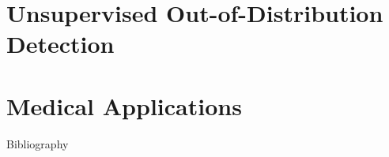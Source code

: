 \documentclass[aspectratio=169,xetex]{beamer}
\title{\color{dtured}\noindent\large\MakeUppercase{\thesistitle}}
\subtitle{\noindent\normalsize\MakeUppercase{\thesissubtitle}}
\author{Jakob D. Havtorn}
\date{\today}
\begin{document}
\frame{\maketitle}





\part{Unsupervised Out-of-Distribution Detection}



\part{Medical Applications}




\begin{frame}[allowframebreaks]{Bibliography}\printbibliography\end{frame}


\end{document}
